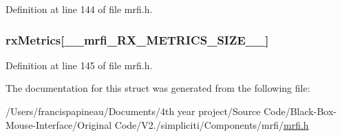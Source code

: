 \-Definition at line 144 of file mrfi.\-h.

\hypertarget{structmrfiPacket__t_a8b95fbda90600ec59752a405fd198770}{
\subsubsection[{rx\-Metrics}]{ {\bf rx\-Metrics}\mbox{[}\-\_\-\-\_\-mrfi\-\_\-\-R\-X\-\_\-\-M\-E\-T\-R\-I\-C\-S\-\_\-\-S\-I\-Z\-E\-\_\-\-\_\-\mbox{]}}}\label{structmrfiPacket__t_a8b95fbda90600ec59752a405fd198770}


\-Definition at line 145 of file mrfi.\-h.



\-The documentation for this struct was generated from the following file\-:\begin{DoxyCompactItemize}
\item 
/\-Users/francispapineau/\-Documents/4th year project/\-Source Code/\-Black-\/\-Box-\/\-Mouse-\/\-Interface/\-Original Code/\-V2./simpliciti/\-Components/mrfi/\hyperlink{mrfi_8h}{mrfi.\-h}\end{DoxyCompactItemize}
